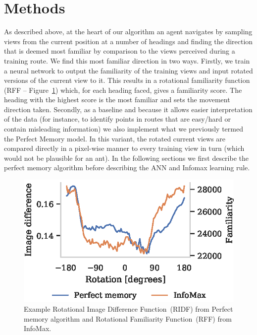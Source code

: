 \documentclass[letterpaper]{article}
\begin{document}
\section{Methods}
As described above, at the heart of our algorithm an agent navigates by sampling views from the current position at a number of headings and finding the direction that is deemed most familiar by comparison to the views perceived during a training route. 
We find this most familiar direction in two ways. 
Firstly, we train a neural network to output the familiarity of the training views and input rotated versions of the current view to it. 
This results in a rotational familiarity function (RFF -- Figure~\ref{fig:good_ridf}) which, for each heading faced, gives a familiarity score.
The heading with the highest score is the most familiar and sets the movement direction taken.
Secondly, as a baseline and because it allows easier interpretation of the data (for instance, to identify points in routes that are easy/hard or contain misleading information) we also implement what we previously termed the Perfect Memory model. 
In this variant, the rotated current views are compared directly in a pixel-wise manner to every training view in turn (which would not be plausible for an ant). 
In the following sections we first describe the perfect memory algorithm before describing the ANN and Infomax learning rule.

\begin{figure}[t]
    \centering
    \includegraphics{figures/good_ridf.eps}
    \caption{Example Rotational Image Difference Function~(RIDF) from Perfect memory algorithm and Rotational Familiarity Function~(RFF) from InfoMax.}
    \label{fig:good_ridf}
\end{figure}
\end{document}
